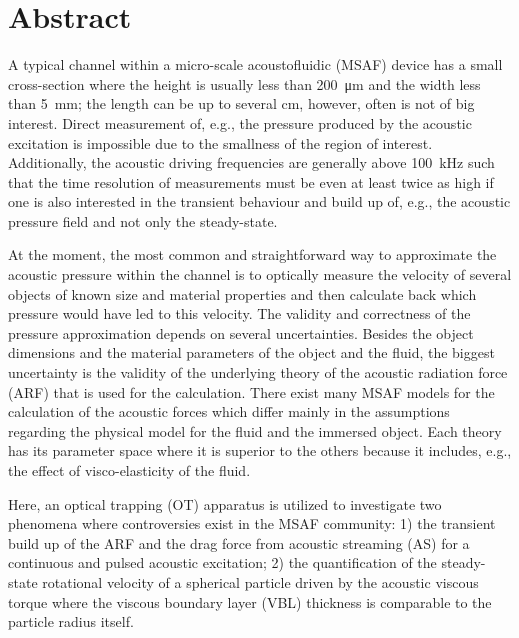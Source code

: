 \chapter*{Abstract} 

A typical channel within a micro-scale acoustofluidic (MSAF) device has a small 
cross-section where the height is usually less than \SI{200}{\um} and the width 
less than \SI{5}{\mm}; the length can be up to several \si{\cm}, however, often 
is not of big interest. Direct measurement of, e.g., the pressure produced by 
the acoustic excitation is impossible due to the smallness of the region of 
interest. Additionally, the acoustic driving frequencies are generally above 
\SI{100}{\kilo\hertz} such that the time resolution of measurements must be 
even at least twice as high if one is also interested in the transient 
behaviour and build up of, e.g., the acoustic pressure field and not only the 
steady-state.

At the moment, the most common and straightforward way to approximate the 
acoustic pressure within the channel is to optically measure the velocity of 
several objects of known size and material properties and then calculate back 
which pressure would have led to this velocity. The validity and correctness of 
the pressure approximation depends on several uncertainties. Besides the object 
dimensions and the material parameters of the object and the fluid, the biggest 
uncertainty is the validity of the underlying theory of the acoustic radiation 
force (ARF) that is used for the calculation. There exist many MSAF models for the 
calculation of the acoustic forces which differ mainly in the assumptions 
regarding the physical model for the fluid and the immersed object. Each theory 
has its parameter space where it is superior to the others because it includes, 
e.g., the effect of visco-elasticity of the fluid.

Here, an optical trapping (OT) apparatus is utilized to investigate two 
phenomena where controversies exist in the MSAF community: 1) the transient 
build up of the ARF and the drag force from acoustic streaming (AS) for a 
continuous and pulsed acoustic excitation; 2) the quantification of the 
steady-state rotational velocity of a spherical particle driven by the acoustic 
viscous torque where the viscous boundary layer (VBL) thickness is comparable 
to the particle radius itself.

